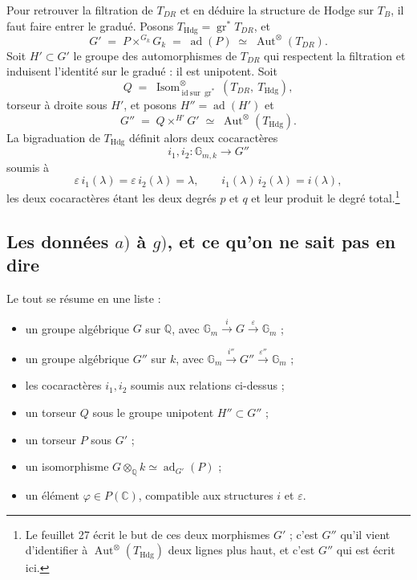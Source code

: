 \documentclass[11pt,a4paper]{article}
\begin{document}
Pour retrouver la filtration de $T_{DR}$ et en déduire la structure de Hodge sur
$T_{B}$, il faut faire entrer le gradué. Posons $T_{\mathrm{Hdg}} =
\operatorname{gr}^{*} T_{DR}$, et
\[
G' \;=\; P \times^{G_{k}} G_{k} \;=\; \operatorname{ad}(P) \;\simeq\; \operatorname{Aut}^{\otimes}(T_{DR}) .
\]
Soit $H' \subset G'$ le groupe des automorphismes de $T_{DR}$ qui respectent la
filtration et induisent l'identité sur le gradué : il est unipotent. Soit
\[
Q \;=\; \operatorname{Isom}^{\otimes}_{\ \mathrm{id}\ \mathrm{sur}\ \operatorname{gr}^{*}}(T_{DR},\ T_{\mathrm{Hdg}}) ,
\]
torseur à droite sous $H'$, et posons $H'' = \operatorname{ad}(H')$ et
\[
G'' \;=\; Q \times^{H'} G' \;\simeq\; \operatorname{Aut}^{\otimes}(T_{\mathrm{Hdg}}) .
\]
La bigraduation de $T_{\mathrm{Hdg}}$ définit alors deux cocaractères
\[
i_{1}, i_{2} : \mathbb{G}_{m,k} \longrightarrow G''
\]
soumis à
\[
\varepsilon\, i_{1}(\lambda) = \varepsilon\, i_{2}(\lambda) = \lambda ,
\qquad i_{1}(\lambda)\, i_{2}(\lambda) = i(\lambda) ,
\]
les deux cocaractères étant les deux degrés $p$ et $q$ et leur produit le degré
total.\footnote{Le feuillet 27 écrit le but de ces deux morphismes $G'$ ; c'est
$G''$ qu'il vient d'identifier à $\operatorname{Aut}^{\otimes}(T_{\mathrm{Hdg}})$
deux lignes plus haut, et c'est $G''$ qui est écrit ici.}

\subsection*{Les données $a)$ à $g)$, et ce qu'on ne sait pas en dire}

Le tout se résume en une liste :

\begin{itemize}
  \item[$a)$] un groupe algébrique $G$ sur $\mathbb{Q}$, avec
  $\mathbb{G}_{m} \xrightarrow{\ i\ } G \xrightarrow{\ \varepsilon\ } \mathbb{G}_{m}$ ;
  \item[$b)$] un groupe algébrique $G''$ sur $k$, avec
  $\mathbb{G}_{m} \xrightarrow{\ i''\ } G'' \xrightarrow{\ \varepsilon''\ } \mathbb{G}_{m}$ ;
  \item[$c)$] les cocaractères $i_{1}, i_{2}$ soumis aux relations ci-dessus ;
  \item[$d)$] un torseur $Q$ sous le groupe unipotent $H'' \subset G''$ ;
  \item[$e)$] un torseur $P$ sous $G'$ ;
  \item[$f)$] un isomorphisme $G \otimes_{\mathbb{Q}} k \simeq \operatorname{ad}_{G'}(P)$ ;
  \item[$g)$] un élément $\varphi \in P(\mathbb{C})$, compatible aux structures
  $i$ et $\varepsilon$.
\end{itemize}
\end{document}
